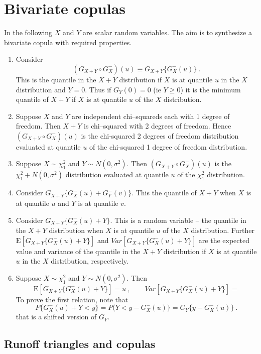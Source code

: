 \documentclass[a4paper,12pt]{article}
\newcommand{\E}{{\mathrm E}}
\begin{document}
\section*{Bivariate copulas}
In the following $X$ and $Y$ are scalar random variables.   The aim is to synthesize a bivariate copula with required properties.
\begin{enumerate}
  \item Consider
  $$(G_{X+Y}\circ G_X^-)(u) \equiv G_{X+Y}\{G_X^{-}(u)\}\ .
  $$
  This is the quantile in the $X+Y$ distribution if $X$ is at quantile $u$  in the $X$ distribution and $Y=0$.
      Thus if $G_Y(0)=0$ (ie $Y\ge 0$) it is the minimum quantile of $X+Y$ if $X$ is at quantile $u$ of the $X$ distribution.
  \item  Suppose $X$ and $Y$ are independent chi--squareds each with 1 degree of freedom.   Then $X+Y$ is chi--squared with 2 degrees of freedom.   Hence $(G_{X+Y}\circ G_X^-)(u)$ is the chi-squared 2 degrees of freedom distribution evaluated at quantile $u$  of the chi-squared 1 degree of freedom distribution.
  \item  Suppose $X\sim\chi_1^2$  and $Y\sim N(0,\sigma^2)$.   Then $(G_{X+Y}\circ G_X^-)(u)$ is the $\chi^2_1+ N(0,\sigma^2)$ distribution evaluated at quantile $u$ of the $\chi^2_1$ distribution.
  \item Consider
  $
  G_{X+Y}\{G_X^-(u)+G_Y^-(v)\}
  $.
  This the quantile of $X+Y$ when $X$ is at quantile $u$ and $Y$ is at quantile $v$.

  \item  Consider $G_{X+Y}\{G^-_X(u)+Y\}$.  This is a random variable -- the quantile in the $X+Y$ distribution when $X$ is at quantile $u$ of the $X$ distribution.  Further
      $
      \E\left[ G_{X+Y}\{G^-_X(u)+Y\}\right]$ and $Var\left[ G_{X+Y}\{G^-_X(u)+Y\}\right]$ are the
      expected value and variance of the quantile in the $X+Y$ distribution if $X$ is at quantile $u$ in the $X$ distribution, respectively.

  \item  Suppose $X\sim \chi^2_1$ and $Y\sim N(0,\sigma^2)$.  Then
      $$
      \E[G_{X+Y}\{G_{X}^-(u)+Y\}]=u\ , \qquad Var[G_{X+Y}\{G_X^-(u)+Y\}]=
      $$
      To prove the first relation, note that
      $$
      P\{G_X^-(u)+Y<y\}=P(Y<y-G_X^-(u)\} = G_Y\{y-G_X^-(u)\}\ .
      $$
      that is a shifted version of $G_Y$.
\end{enumerate}
\subsection*{Runoff triangles and copulas}
\end{document}
